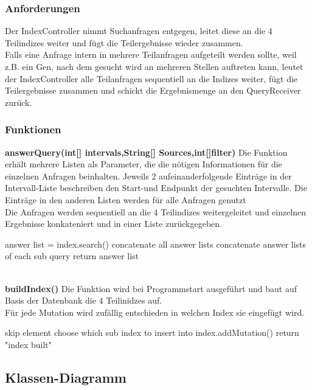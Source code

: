 \subsubsection{Anforderungen}
Der IndexController nimmt Suchanfragen entgegen, leitet diese an die 4 Teilindizes weiter und fügt die Teilergebnisse wieder zusammen.\\Falls eine Anfrage intern in mehrere Teilanfragen aufgeteilt werden sollte, weil z.B. ein Gen, nach dem gesucht wird an mehreren Stellen auftreten kann, leutet der IndexController alle Teilanfragen sequentiell an die Indizes weiter, fügt die Teilergebnisse zusammen und schickt die Ergebnismenge an den QueryReceiver zurück.
\subsubsection{Funktionen}
\textbf{answerQuery(int[] intervals,String[] Sources,int[]filter)}
Die Funktion erhält mehrere Listen als Parameter, die die nötigen Informationen für die einzelnen Anfragen beinhalten. Jeweils 2 aufeinanderfolgende Einträge in der Intervall-Liste beschreiben den Start-und Endpunkt der gesuchten Intervalle. Die Einträge in den anderen Listen werden für alle Anfragen genutzt\\
Die Anfragen werden sequentiell an die 4 Teilindizes weitergeleitet und einzelnen Ergebnisse konkateniert und in einer Liste zurückgegeben.
\begin{algorithm}
{
{answer list = index.search()\;}
concatenate all answer lists\;
}
concatenate answer lists of each sub query\;
return answer list\;
\end{algorithm}
\\
\textbf{buildIndex()}
Die Funktion wird bei Programmstart ausgeführt und baut auf Basis der Datenbank die 4 Teilinidzes auf.\\
Für jede Mutation wird zufällig entschieden in welchen Index sie eingefügt wird.\\
\begin{algorithm}
{
{skip element\;}
choose which sub index to insert into\;
index.addMutation()\;
}
return "index built"\;
\end{algorithm}

\newpage
\subsection{Klassen-Diagramm}

